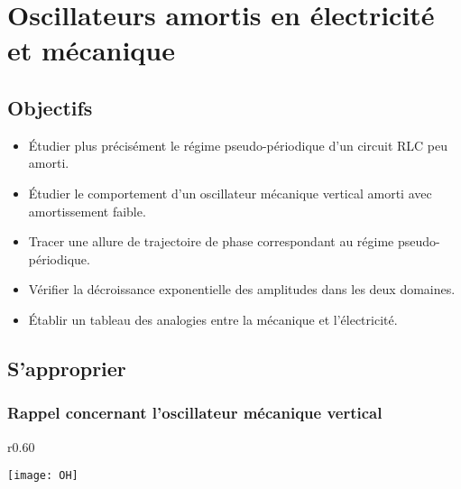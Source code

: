 \documentclass[a4paper, 11pt, final, garamond]{book}
\begin{document}
\setcounter{chapter}{7}

\chapter{Oscillateurs amortis en \'electricit\'e et m\'ecanique}
\section{Objectifs}

\begin{itemize}
    \item Étudier plus précisément le régime pseudo-périodique d'un circuit RLC
        peu amorti.
    \item  Étudier le comportement d'un oscillateur mécanique vertical amorti
        avec amortissement faible.
    \item  Tracer  une allure de trajectoire de phase correspondant au régime
        pseudo-périodique.
    \item  Vérifier la décroissance exponentielle des amplitudes dans les deux
        domaines.
    \item  Établir un tableau des analogies entre la mécanique et l'électricité.
\end{itemize}


\section{S'approprier}

%

\subsection{Rappel concernant l'oscillateur mécanique vertical}

\begin{wrapfigure}[11]{r}{0.60\linewidth}
    \vspace{-35pt}
    \begin{center}
        \texttt{[image: OH]}
    \end{center}
\end{wrapfigure} 
\end{document}
